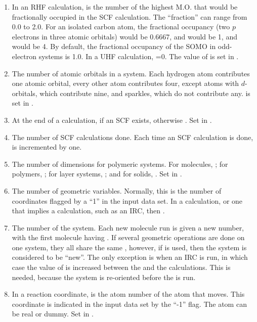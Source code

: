 \begin{enumerate}
\item{} In an RHF calculation,  is the number of
the highest M.O. that would be fractionally occupied in the SCF calculation.
The ``fraction'' can range from 0.0 to 2.0.  For an isolated carbon atom, the
fractional occupancy (two $p$ electrons in three atomic orbitals) would be
0.6667, and  would be 1, and  would be 4.  By default,
the fractional occupancy of the SOMO in odd-electron
systems is 1.0. In a UHF calculation, =0.
The value of  is set in  .
\item{} The number of atomic orbitals in a system.  Each hydrogen atom
contributes one atomic orbital, every other atom contributes four, except atoms
with $d$-orbitals, which contribute nine, and sparkles, which do not
contribute any.   is set in .
\item{} At the end of a calculation,  if an SCF exists,
otherwise .  Set in .
\item {} The number of SCF calculations done.  Each time an SCF
calculation is done,  is incremented by one.
\item {} The number of dimensions for polymeric systems.  For molecules,
; for polymers, ; for layer systems, ; and for
solids, .  Set in .
\item {} The number of geometric variables.  Normally, this is the
number of coordinates flagged by a ``1'' in the input data set.  In a 
calculation, or one that implies a  calculation, such as an IRC,
then .
\item {}  The number of the system.  Each new molecule run is given
a new number, with the first molecule having .  If several
geometric operations are done on one system, they all share the
same , however, if  is used, then the system
is considered to be ``new''. The only exception is when an IRC is run, in which
case the value of  is increased between the 
and the  calculations.  This is needed, because the system is
re-oriented before the  is run.
\item {} In a reaction coordinate,  is the atom number
of the atom that moves.  This coordinate is indicated in the input data set
by the ``-1'' flag.  The atom can be real or dummy. Set in .

\end{enumerate}
